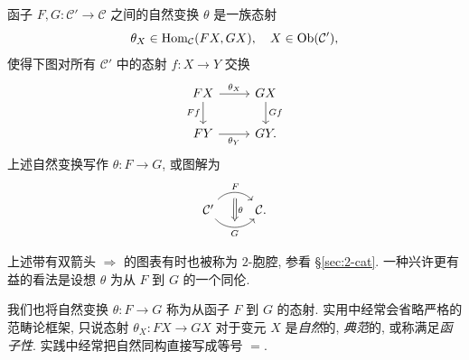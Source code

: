 \begin{definition}
	函子 $F, G: \mathcal{C}' \to \mathcal{C}$ 之间的自然变换 $\theta$ 是一族态射
	\[ \theta_X \in \operatorname{Hom}_{\mathcal{C}}(FX, GX), \quad X \in \operatorname{Ob}(\mathcal{C}'), \]
	使得下图对所有 $\mathcal{C}'$ 中的态射 $f: X \to Y$ 交换
	\begin{equation}\label{eqn:naturaltrans-def}\begin{tikzcd}
		FX \arrow[r, "\theta_X"] \ar[d, "Ff"'] & GX \arrow[d, "Gf"] \\
		FY \arrow[r, "\theta_Y"'] & GY .
	\end{tikzcd}\end{equation}
	上述自然变换写作 $\theta: F \to G$, 或图解为
	\[ \begin{tikzcd}
		\mathcal{C}' \arrow[bend left=50, r, "F", ""' name=U] \arrow[bend right=50, r, "G"', "" name=D] & \arrow[Rightarrow, to path=(U) -- (D) \tikztonodes, "\theta"] \mathcal{C}.
	\end{tikzcd} \]
\end{definition}
上述带有双箭头 $\Rightarrow$ 的图表有时也被称为 $2$-胞腔, 参看 \S\ref{sec:2-cat}. 一种兴许更有益的看法是设想 $\theta$ 为从 $F$ 到 $G$ 的一个同伦.

\begin{convention}\label{con:naturaltrans-morphism}
	我们也将自然变换 $\theta: F \to G$ 称为从函子 $F$ 到 $G$ 的态射. 实用中经常会省略严格的范畴论框架, 只说态射 $\theta_X: FX \to GX$ 对于变元 $X$ 是\emph{自然}的, \emph{典范}的, 或称满足\emph{函子性}. 实践中经常把自然同构直接写成等号 $=$.
\end{convention}

